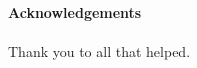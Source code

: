 \thispagestyle{fancy}

\textrm{}\\\\
\noindent\textbf{\huge\textsf{Acknowledgements}}\\\\

\noindent Thank you to all that helped.
